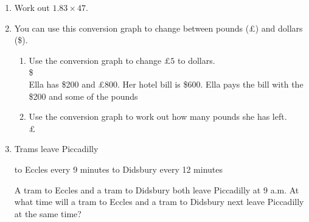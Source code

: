 \begin{enumerate}
    \item Work out $1.83 \times 47$.
    \newpage
    \item You can use this conversion graph to change between pounds (\pounds) and dollars (\$).
    \begin{figure}[H]
      \centering
      \end{figure}
      \begin{enumerate}
        \item Use the conversion graph to change $\pounds 5$ to dollars.\\[1cm]\vspace*{0pt}\hfill\$\dline\\
        Ella has \$200 and \pounds 800. Her hotel bill is \$600. Ella pays the bill with the \$200 and some of the pounds
        \item Use the conversion graph to work out how many pounds she has left.\\[1cm]\vspace*{0pt}\hfill\pounds\dline
      \end{enumerate}
      \item Trams leave Piccadilly\par
      \hspace*{2cm} to Eccles every 9 minutes \hspace*{2cm} to Didsbury every 12 minutes\par
      A tram to Eccles and a tram to Didsbury both leave Piccadilly at 9 a.m. At what time will a tram to Eccles  and a tram to Didsbury next leave Piccadilly at the same time?\\[2cm]\vspace*{0pt}\hfill\dline

\end{enumerate}
